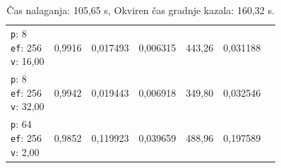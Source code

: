 \begin{table}[htbp]
\begin{tabularx}{\textwidth}{Xrrrrrr}
    \makecell{\texttt{p}: 8\\\texttt{ef}: 256\\\texttt{v}: 16,00} & 0,9916 & 0,017493 & 0,006315 & 443,26 & 0,031188 \\
    \makecell{\texttt{p}: 8\\\texttt{ef}: 256\\\texttt{v}: 32,00} & 0,9942 & 0,019443 & 0,006918 & 349,80 & 0,032546 \\
    \makecell{\texttt{p}: 64\\\texttt{ef}: 256\\\texttt{v}: 2,00} & 0,9852 & 0,119923 & 0,039659 & 488,96 & 0,197589 \\
    \bottomrule
  \end{tabularx}
\caption* {Čas nalaganja: 105,65 s, Okviren čas gradnje kazala: 160,32 s.}\end{table}


